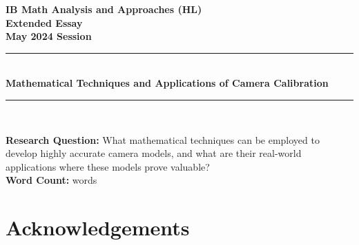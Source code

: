 \documentclass[12pt, oneside]{article}
\providecommand{\totalwordcount}{}
\begin{document}
\pagestyle{frontmatter}

\begin{titlepage}
    \large

    \begin{center}

        \vspace*{2cm}

        {\bfseries
            IB Math Analysis and Approaches (HL) \\
            Extended Essay\\
            May 2024 Session}\\

        \vspace*{\fill}

        \rule{\linewidth}{1.5pt} \\ [0.5cm]
        {\LARGE \bfseries Mathematical Techniques and Applications of Camera Calibration }
        \rule{\linewidth}{0.5pt} \\

        \vspace*{\fill}

        \textbf{Research Question:} What mathematical techniques can be employed to develop highly accurate camera models, and what are their real-world applications where these models prove valuable? \\ [1cm]

        \textbf{Word Count:} \totalwordcount words

        \vspace*{2cm}

    \end{center}

\end{titlepage}

\tableofcontents
\clearpage
\pagestyle{mainmatter}
\setcounter{page}{1}











\section*{Acknowledgements}
\end{document}
